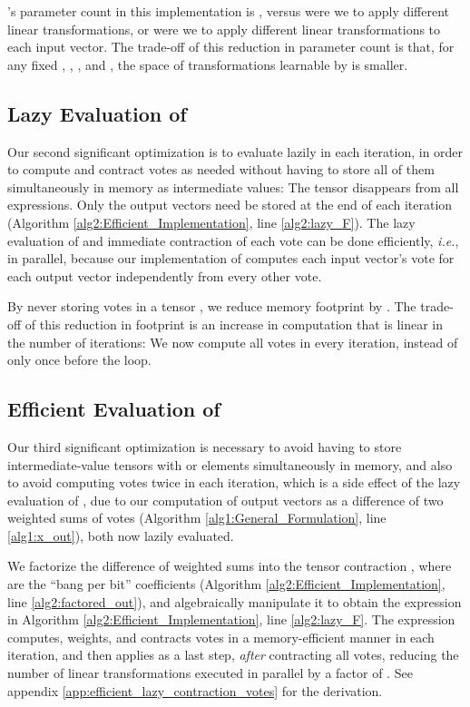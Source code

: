 \documentclass[11pt,a4paper]{article}
\begin{document}
's parameter count in this implementation is , versus  were we to apply  different linear transformations, or  were we to apply  different linear transformations to each input vector. The trade-off of this reduction in parameter count is that, for any fixed , , , and , the space of transformations learnable by  is smaller.

\subsection{Lazy Evaluation of }

Our second significant optimization is to evaluate  lazily in each iteration, in order to compute and contract votes as needed without having to store all of them simultaneously in memory as intermediate values: The tensor  disappears from all expressions. Only the output vectors need be stored at the end of each iteration (Algorithm \ref{alg2:Efficient_Implementation}, line \ref{alg2:lazy_F}). The lazy evaluation of  and immediate contraction of each vote can be done efficiently, {\em i.e.}, in parallel, because our implementation of  computes each input vector's vote for each output vector independently from every other vote.

By never storing votes in a tensor , we reduce memory footprint by . The trade-off of this reduction in footprint is an increase in computation that is linear in the number of iterations: We now compute all votes in every iteration, instead of only once before the loop.

\subsection{Efficient Evaluation of }

Our third significant optimization is necessary to avoid having to store intermediate-value tensors with  or  elements simultaneously in memory, and also to avoid computing votes twice in each iteration, which is a side effect of the lazy evaluation of , due to our computation of output vectors as a difference of two weighted sums of votes (Algorithm \ref{alg1:General_Formulation}, line \ref{alg1:x_out}), both now lazily evaluated.

We factorize the difference of weighted sums into the tensor contraction , where  are the ``bang per bit'' coefficients (Algorithm \ref{alg2:Efficient_Implementation}, line \ref{alg2:factored_out}), and algebraically manipulate it to obtain the expression in Algorithm \ref{alg2:Efficient_Implementation}, line \ref{alg2:lazy_F}. The expression computes, weights, and contracts votes in a memory-efficient manner in each iteration, and then applies  as a last step, {\em after} contracting all votes, reducing the number of linear transformations executed in parallel by a factor of . See appendix \ref{app:efficient_lazy_contraction_votes} for the derivation.
\end{document}
